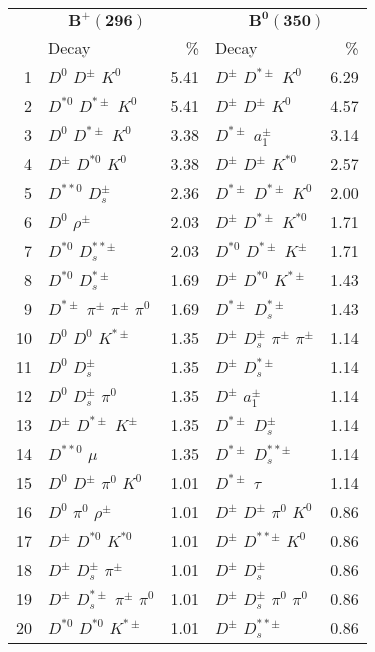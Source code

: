 \documentclass[6pt]{article}
\begin{document}
\begin{tabular}{rlr|lr}
\multicolumn{3}{c|}{$\boldsymbol{B^+(296)}$} & \multicolumn{2}{c}{$\boldsymbol{B^0(350)}$} \\
& Decay & \% & Decay & \% \\ \hline \hline
1 & $D^0$ $D^{\pm}$ $K^0$ & 5.41 & $D^{\pm}$ $D^{*\pm}$ $K^0$ & 6.29 \\
2 & $D^{*0}$ $D^{*\pm}$ $K^0$ & 5.41 & $D^{\pm}$ $D^{\pm}$ $K^0$ & 4.57 \\
3 & $D^0$ $D^{*\pm}$ $K^0$ & 3.38 & $D^{*\pm}$ $a_1^{\pm}$ & 3.14 \\
4 & $D^{\pm}$ $D^{*0}$ $K^0$ & 3.38 & $D^{\pm}$ $D^{\pm}$ $K^{*0}$ & 2.57 \\
5 & $D^{**0}$ $D_s^{\pm}$ & 2.36 & $D^{*\pm}$ $D^{*\pm}$ $K^0$ & 2.00 \\
6 & $D^0$ $\rho^{\pm}$ & 2.03 & $D^{\pm}$ $D^{*\pm}$ $K^{*0}$ & 1.71 \\
7 & $D^{*0}$ $D_s^{**\pm}$ & 2.03 & $D^{*0}$ $D^{*\pm}$ $K^{\pm}$ & 1.71 \\
8 & $D^{*0}$ $D_s^{*\pm}$ & 1.69 & $D^{\pm}$ $D^{*0}$ $K^{*\pm}$ & 1.43 \\
9 & $D^{*\pm}$ $\pi^{\pm}$ $\pi^{\pm}$ $\pi^0$ & 1.69 & $D^{*\pm}$ $D_s^{*\pm}$ & 1.43 \\
10 & $D^0$ $D^0$ $K^{*\pm}$ & 1.35 & $D^{\pm}$ $D_s^{\pm}$ $\pi^{\pm}$ $\pi^{\pm}$ & 1.14 \\
11 & $D^0$ $D_s^{\pm}$ & 1.35 & $D^{\pm}$ $D_s^{*\pm}$ & 1.14 \\
12 & $D^0$ $D_s^{\pm}$ $\pi^0$ & 1.35 & $D^{\pm}$ $a_1^{\pm}$ & 1.14 \\
13 & $D^{\pm}$ $D^{*\pm}$ $K^{\pm}$ & 1.35 & $D^{*\pm}$ $D_s^{\pm}$ & 1.14 \\
14 & $D^{**0}$ $\mu$ & 1.35 & $D^{*\pm}$ $D_s^{**\pm}$ & 1.14 \\
15 & $D^0$ $D^{\pm}$ $\pi^0$ $K^0$ & 1.01 & $D^{*\pm}$ $\tau$ & 1.14 \\
16 & $D^0$ $\pi^0$ $\rho^{\pm}$ & 1.01 & $D^{\pm}$ $D^{\pm}$ $\pi^0$ $K^0$ & 0.86 \\
17 & $D^{\pm}$ $D^{*0}$ $K^{*0}$ & 1.01 & $D^{\pm}$ $D^{**\pm}$ $K^0$ & 0.86 \\
18 & $D^{\pm}$ $D_s^{\pm}$ $\pi^{\pm}$ & 1.01 & $D^{\pm}$ $D_s^{\pm}$ & 0.86 \\
19 & $D^{\pm}$ $D_s^{*\pm}$ $\pi^{\pm}$ $\pi^0$ & 1.01 & $D^{\pm}$ $D_s^{\pm}$ $\pi^0$ $\pi^0$ & 0.86 \\
20 & $D^{*0}$ $D^{*0}$ $K^{*\pm}$ & 1.01 & $D^{\pm}$ $D_s^{**\pm}$ & 0.86 \\

\end{tabular}
\end{document}
